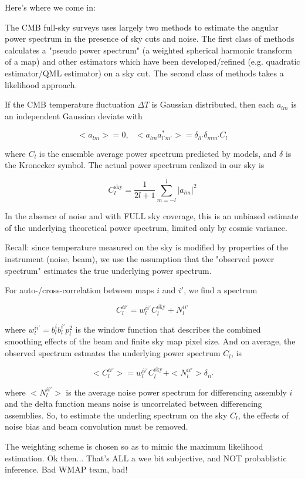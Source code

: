 \documentclass[a4paper, 11pt]{article}
\begin{document}
Here's where we come in:

The CMB full-sky surveys uses largely two methods to estimate the angular power spectrum in the presence of sky cuts and noise. The first class of methods calculates a "pseudo power spectrum" (a weighted spherical harmonic transform of a map) and other estimators which have been developed/refined (e.g. quadratic estimator/QML estimator) on a sky cut. The second class of methods takes a likelihood approach. 


If the CMB temperature fluctuation $\Delta T$ is Gaussian distributed, then each $a_{lm}$ is an independent Gaussian deviate with 

$$
<a_{lm}>=0, \ \ \ <a_{lm}a^{*}_{l'm'}>=\delta_{ll'}\delta_{mm'}C_l
$$

where $C_l$ is the ensemble average power spectrum predicted by models, and $\delta$ is the Kronecker symbol. The actual power spectrum realized in our sky is

$$
C^{\text{sky}}_l=\frac{1}{2l+1}\sum^{l}_{m=-l}\vert a_{lm} \vert^2
$$

In the absence of noise and with FULL sky coverage, this is an unbiased estimate of the underlying theoretical power spectrum, limited only by cosmic variance. 


Recall: since temperature measured on the sky is modified by properties of the instrument (noise, beam), we use the assumption that the "observed power spectrum" estimates the true underlying power spectrum. 

For auto-/cross-correlation between maps $i$ and $i'$, we find a spectrum 

$$
C^{ii'}_l=w^{ii'}_lC^{\text{sky}}_l+N^{ii'}_l
$$

where $w^{ii'}_l=b^{i}_l{}b^{i'}_{l}p^{2}_{l}$ is the window function that describes the combined smoothing effects of the beam and finite sky map pixel size. And on average, the observed spectrum estmates the underlying power spectrum $C_l$, is 

$$
<C^{ii'}_l>=w^{ii'}_lC^{\text{sky}}_l+<N^{ii'}_l>\delta_{ii'}
$$

where $<N^{ii'}_l>$ is the average noise power spectrum for differencing assembly $i$ and the delta function means noise is uncorrelated between differencing assemblies. So, to estimate the underling spectrum on the sky $C_l$, the effects of noise bias and beam convolution must be removed. 

The weighting scheme is chosen so as to mimic the maximum likelihood estimation. Ok then... That's ALL a wee bit subjective, and NOT probablistic inference. Bad WMAP team, bad!
\end{document}
